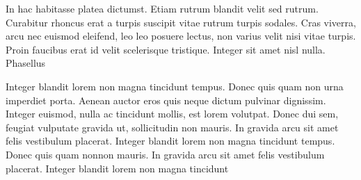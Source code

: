 In hac habitasse platea dictumst. Etiam rutrum blandit velit sed
rutrum. Curabitur rhoncus erat a turpis suscipit vitae rutrum turpis
sodales. Cras viverra, arcu nec euismod eleifend, leo leo posuere
lectus, non varius velit nisi vitae turpis. Proin faucibus erat id
velit scelerisque tristique. Integer sit amet nisl nulla. Phasellus

\startrule %
Integer blandit lorem non magna tincidunt tempus. Donec quis quam non
urna imperdiet porta. Aenean auctor eros quis neque dictum pulvinar
dignissim. Integer euismod, nulla ac tincidunt mollis, est lorem
volutpat. Donec dui sem, feugiat vulputate gravida ut, sollicitudin
non mauris. In gravida arcu sit amet felis vestibulum placerat.
Integer blandit lorem non magna tincidunt tempus. Donec quis quam nonnon mauris. In gravida arcu sit amet felis vestibulum placerat.
Integer blandit lorem non magna tincidunt 
\endrule


\bye
